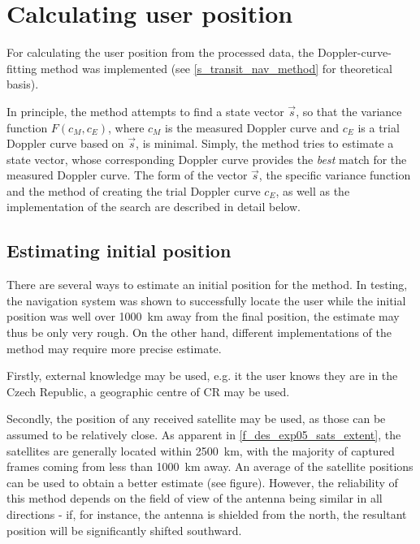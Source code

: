 \section{Calculating user position}
For calculating the user position from the processed data, the Doppler-curve-fitting method was implemented (see \autoref{s_transit_nav_method} for theoretical basis). %

In principle, the method attempts to find a state vector $\Vec{s}$, so that the variance function $F(c_M, c_E)$, where $c_M$ is the measured Doppler curve and $c_E$ is a trial Doppler curve based on $\Vec{s}$, is minimal. Simply, the method tries to estimate a state vector, whose corresponding Doppler curve provides the \textit{best} match for the measured Doppler curve. The form of the vector $\Vec{s}$, the specific variance function and the method of creating the trial Doppler curve $c_E$, as well as the implementation of the search are described in detail below.

\subsection{Estimating initial position}
There are several ways to estimate an initial position for the method. In testing, the navigation system was shown to successfully locate the user while the initial position was well over \qty{1000}{km} away from the final position, the estimate may thus be only very rough. On the other hand, different implementations of the method may require more precise estimate.

Firstly, external knowledge may be used, e.g. it the user knows they are in the Czech Republic, a geographic centre of CR may be used.

Secondly, the position of any received satellite may be used, as those can be assumed to be relatively close. As apparent in \autoref{f_des_exp05_sats_extent}, the satellites are generally located within \qty{2500}{km}, with the majority of captured frames coming from less than \qty{1000}{km} away. An average of the satellite positions can be used to obtain a better estimate (see figure). However, the reliability of this method depends on the field of view of the antenna being similar in all directions - if, for instance, the antenna is shielded from the north, the resultant position will be significantly shifted southward.

